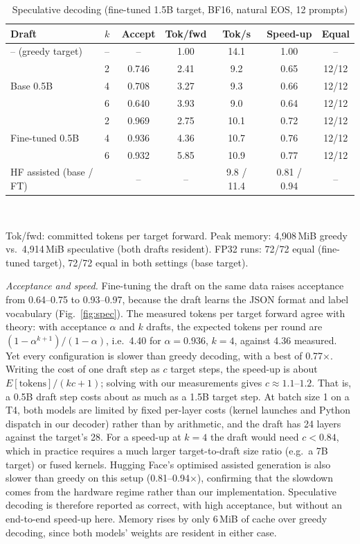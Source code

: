 \documentclass[conference]{IEEEtran}
\begin{document}
\begin{table}[t]
\caption{Speculative decoding (fine-tuned 1.5B target, BF16, natural EOS, 12 prompts)}
\label{tab:spec}
\centering
\footnotesize
\setlength{\tabcolsep}{3pt}
\begin{tabular}{llccccc}
\toprule
Draft & $k$ & Accept & Tok/fwd & Tok/s & Speed-up & Equal\\
\midrule
-- (greedy target) & -- & -- & 1.00 & 14.1 & 1.00 & --\\
\midrule
\multirow{3}{*}{Base 0.5B} & 2 & 0.746 & 2.41 & 9.2 & 0.65 & 12/12\\
 & 4 & 0.708 & 3.27 & 9.3 & 0.66 & 12/12\\
 & 6 & 0.640 & 3.93 & 9.0 & 0.64 & 12/12\\
\midrule
\multirow{3}{*}{Fine-tuned 0.5B} & 2 & 0.969 & 2.75 & 10.1 & 0.72 & 12/12\\
 & 4 & 0.936 & 4.36 & 10.7 & 0.76 & 12/12\\
 & 6 & 0.932 & 5.85 & 10.9 & 0.77 & 12/12\\
\midrule
\multicolumn{2}{l}{HF assisted (base / FT)} & -- & -- & 9.8 / 11.4 & 0.81 / 0.94 & --\\
\bottomrule
\end{tabular}
\\[2pt]
\parbox{\columnwidth}{\scriptsize Tok/fwd: committed tokens per target forward. Peak memory: 4{,}908\,MiB greedy vs.\ 4{,}914\,MiB speculative (both drafts resident). FP32 runs: 72/72 equal (fine-tuned target), 72/72 equal in both settings (base target).}
\end{table}

\textit{Acceptance and speed.} Fine-tuning the draft on the same data raises acceptance from 0.64--0.75 to 0.93--0.97, because the draft learns the JSON format and label vocabulary (Fig.~\ref{fig:spec}). The measured tokens per target forward agree with theory: with acceptance $\alpha$ and $k$ drafts, the expected tokens per round are $(1-\alpha^{k+1})/(1-\alpha)$, i.e.\ 4.40 for $\alpha{=}0.936$, $k{=}4$, against 4.36 measured. Yet every configuration is slower than greedy decoding, with a best of 0.77$\times$. Writing the cost of one draft step as $c$ target steps, the speed-up is about $E[\text{tokens}]/(kc+1)$; solving with our measurements gives $c\approx1.1$--$1.2$. That is, a 0.5B draft step costs about as much as a 1.5B target step. At batch size 1 on a T4, both models are limited by fixed per-layer costs (kernel launches and Python dispatch in our decoder) rather than by arithmetic, and the draft has 24 layers against the target's 28. For a speed-up at $k{=}4$ the draft would need $c<0.84$, which in practice requires a much larger target-to-draft size ratio (e.g.\ a 7B target) or fused kernels. Hugging Face's optimised assisted generation is also slower than greedy on this setup (0.81--0.94$\times$), confirming that the slowdown comes from the hardware regime rather than our implementation. Speculative decoding is therefore reported as correct, with high acceptance, but without an end-to-end speed-up here. Memory rises by only 6\,MiB of cache over greedy decoding, since both models' weights are resident in either case.
\end{document}
